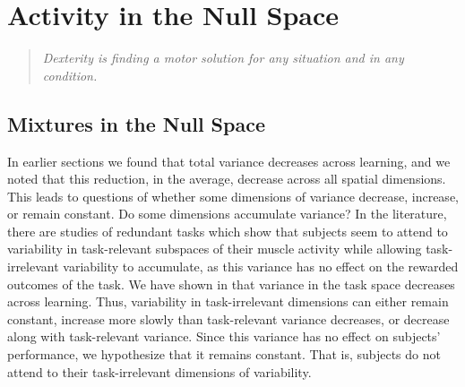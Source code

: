 \documentclass[../main.tex]{subfiles}
\begin{document}
\chapter{Activity in the Null Space}\label{chap:nullspace}

  
  \begin{quote}
    \emph{Dexterity is finding a motor solution for any situation and in any condition.}\\
  \end{quote}
  
  
  \cleardoublepage%
  
  \section{Mixtures in the Null Space}
  
  
  In earlier sections we found that total variance decreases across learning, and we noted that this reduction, in the average, decrease across all spatial dimensions. This leads to questions of whether some dimensions of variance decrease, increase, or remain constant. Do some dimensions accumulate variance? In the literature, there are studies of redundant tasks which show that subjects seem to attend to variability in task-relevant subspaces of their muscle activity while allowing task-irrelevant variability to accumulate, as this variance has no effect on the rewarded outcomes of the task\cite{Valero-Cuevas2009,scholzUncontrolledManifoldConcept1999}. We have shown in  that variance in the task space decreases across learning. Thus, variability in task-irrelevant dimensions can either remain constant, increase more slowly than task-relevant variance decreases, or decrease along with task-relevant variance. Since this variance has no effect on subjects' performance, we hypothesize that it remains constant. That is, subjects do not attend to their task-irrelevant dimensions of variability. 
  
\end{document}
